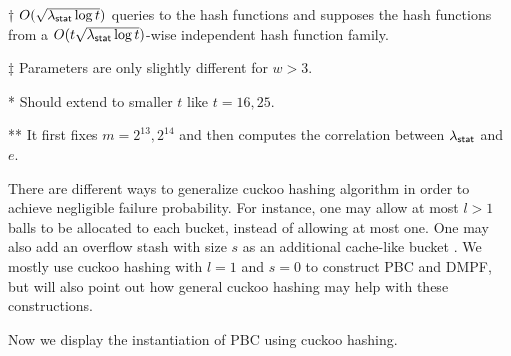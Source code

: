 \begin{table*}
\begin{threeparttable}
\begin{tabular}{cccccc}
      \bottomrule
    \end{tabular}	
    \begin{tablenotes}
      \item [$\dag$] $O(\sqrt{\lambda_{\sf stat} \log t})$ queries to the hash functions and supposes the hash functions from a $O(t\sqrt{\lambda_{\sf stat} \log t})$-wise independent hash function family. 
      \item [$\ddag$] Parameters are only slightly different for $w>3$. 
      \item [*] Should extend to smaller $t$ like $t = 16, 25$.
      \item [**]It first fixes $m = 2^{13}, 2^{14}$ and then computes the correlation between $\lambda_{\sf stat}$ and $e$.   
      \end{tablenotes}
  \end{threeparttable}
\end{table*}

There are different ways to generalize cuckoo hashing algorithm in order to achieve negligible failure probability. For instance, one may allow at most $l>1$ balls to be allocated to each bucket, instead of allowing at most one. One may also add an overflow stash with size $s$ as an additional cache-like bucket \cite{KMW10}. We mostly use cuckoo hashing with $l=1$ and $s=0$ to construct PBC and DMPF, but will also point out how general cuckoo hashing may help with these constructions.

Now we display the instantiation of PBC using cuckoo hashing. 

